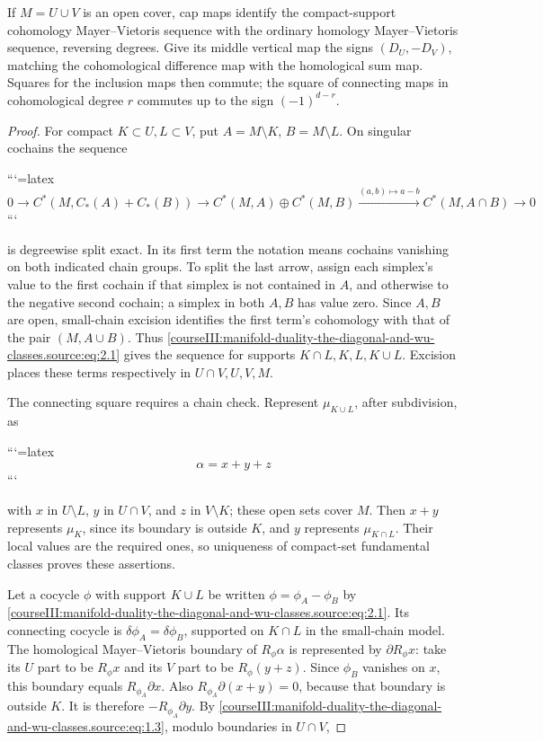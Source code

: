 \begin{lemma}
If \(M=U\cup V\) is an open cover, cap maps identify the compact-support cohomology Mayer–Vietoris sequence with the ordinary homology Mayer–Vietoris sequence, reversing degrees. Give its middle vertical map the signs \((D_U,-D_V)\), matching the cohomological difference map with the homological sum map. Squares for the inclusion maps then commute; the square of connecting maps in cohomological degree \(r\) commutes up to the sign \((-1)^{d-r}\).
\end{lemma}
\begin{proof}
For compact \(K\subset U,L\subset V\), put \(A=M\setminus K\), \(B=M\setminus L\). On singular cochains the sequence


```{=latex}
\begin{equation}
0\to C^*(M,C_*(A)+C_*(B))\to C^*(M,A)\oplus C^*(M,B)
\xrightarrow{(a,b)\mapsto a-b} C^*(M,A\cap B)\to0
\label{courseIII:manifold-duality-the-diagonal-and-wu-classes.source:eq:2.1}
\end{equation}
```


is degreewise split exact. In its first term the notation means cochains vanishing on both indicated chain groups. To split the last arrow, assign each simplex's value to the first cochain if that simplex is not contained in \(A\), and otherwise to the negative second cochain; a simplex in both \(A,B\) has value zero. Since \(A,B\) are open, small-chain excision identifies the first term's cohomology with that of the pair \((M,A\cup B)\). Thus \eqref{courseIII:manifold-duality-the-diagonal-and-wu-classes.source:eq:2.1} gives the sequence for supports \(K\cap L,K,L,K\cup L\). Excision places these terms respectively in \(U\cap V,U,V,M\).

The connecting square requires a chain check. Represent \(\mu_{K\cup L}\), after subdivision, as


```{=latex}
\[
\alpha=x+y+z
\]
```


with \(x\) in \(U\setminus L\), \(y\) in \(U\cap V\), and \(z\) in \(V\setminus K\); these open sets cover \(M\). Then \(x+y\) represents \(\mu_K\), since its boundary is outside \(K\), and \(y\) represents \(\mu_{K\cap L}\). Their local values are the required ones, so uniqueness of compact-set fundamental classes proves these assertions.

Let a cocycle \(\phi\) with support \(K\cup L\) be written \(\phi=\phi_A-\phi_B\) by \eqref{courseIII:manifold-duality-the-diagonal-and-wu-classes.source:eq:2.1}. Its connecting cocycle is \(\delta\phi_A=\delta\phi_B\), supported on \(K\cap L\) in the small-chain model. The homological Mayer–Vietoris boundary of \(R_\phi\alpha\) is represented by \(\partial R_\phi x\): take its \(U\) part to be \(R_\phi x\) and its \(V\) part to be \(R_\phi(y+z)\). Since \(\phi_B\) vanishes on \(x\), this boundary equals \(R_{\phi_A}\partial x\). Also \(R_{\phi_A}\partial(x+y)=0\), because that boundary is outside \(K\). It is therefore \(-R_{\phi_A}\partial y\). By \eqref{courseIII:manifold-duality-the-diagonal-and-wu-classes.source:eq:1.3}, modulo boundaries in \(U\cap V\),



\end{proof}

